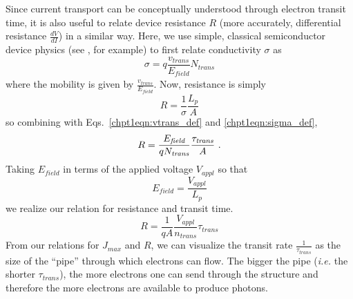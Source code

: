 \documentclass[12pt]{report}
\begin{document}
Since current transport can be conceptually understood through electron transit time, it is also useful to relate device resistance $R$ (more accurately, differential resistance $\frac{d V}{d\!I}$) in a similar way.  Here, we use simple, classical semiconductor device physics (see \cite{Sze}, for example) to first relate conductivity $\sigma$ as
\begin{equation}
\label{chpt1eqn:sigma_def}
\sigma = q  \frac{v_\textit{trans}}{E_\textit{field}} N_\textit{trans}
\end{equation}
where the mobility is given by $\frac{v_\textit{trans}}{E_\textit{field}}$.  Now, resistance is simply
\begin{equation}
R = \frac{1}{\sigma} \frac{L_p}{A}
\end{equation}
so combining with Eqs.~\eqref{chpt1eqn:vtrans_def} and \eqref{chpt1eqn:sigma_def},
\begin{equation}
R = \frac{E_\textit{field}}{q N_\textit{trans}} \frac{\tau_\textit{trans}}{A} \textnormal{~.}
\end{equation}
Taking $E_\textit{field}$ in terms of the applied voltage $V_\textit{appl}$ so that
\begin{equation}
E_\textit{field} = \frac{V_\textit{appl}}{L_p}
\end{equation}
we realize our relation for resistance and transit time.
\begin{equation}
R = \frac{1}{q A} \frac{V_\textit{appl}}{n_\textit{trans}}  \tau_\textit{trans}
\end{equation}
From our relations for $J_{max}$ and $R$, we can visualize the transit rate $\frac{1}{\tau_\textit{trans}}$ as the size of the ``pipe'' through which electrons can flow.  The bigger the pipe (\emph{i.e.} the shorter $\tau_\textit{trans}$), the more electrons one can send through the structure and therefore the more electrons are available to produce photons.



\end{document}
